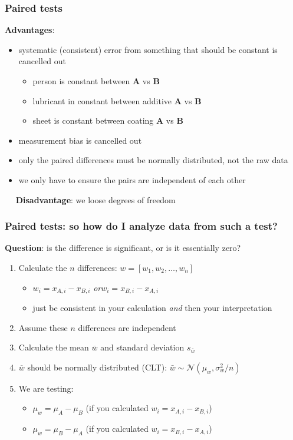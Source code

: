 \begin{frame}\frametitle{Paired tests}

	\textbf{Advantages}:
	\begin{itemize}
		\item	systematic (consistent) error from something that should be constant is cancelled out
		\begin{itemize}
			\item	person is constant between \textbf{A} vs \textbf{B}
			\item	lubricant in constant between additive \textbf{A} vs \textbf{B}
			\item	sheet is constant between coating \textbf{A} vs \textbf{B}
		\end{itemize}
		\item	measurement bias is cancelled out
		\item	only the paired differences must be normally distributed, not the raw data
		\item	we only have to ensure the pairs are independent of each other
	\end{itemize}

	$\quad$ \textbf{Disadvantage}: we loose degrees of freedom
\end{frame}

\begin{frame}\frametitle{Paired tests: so how do I analyze data from such a test?}

	\textbf{Question}: is the difference is significant, or is it essentially zero?
	\begin{enumerate}
		\item	Calculate the $n$ differences: $w = [w_1, w_2, \ldots, w_n]$
		\begin{itemize}
			\item	$w_i = x_{A,i} - x_{B,i}$  \qquad\emph{or}\qquad $w_i = x_{B,i} - x_{A,i}$
			\item	just be consistent in your calculation \emph{and} then your interpretation
		\end{itemize}
		\item	Assume these $n$ differences are independent
		\item	Calculate the mean $\overline{w}$ and standard deviation $s_{\overline{w}}$
		\item	$\overline{w}$ should be normally distributed (CLT): $\bar{w} \sim \mathcal{N}\left(\mu_w, \sigma_w^2/n \right)$
		\item	We are testing:
		\begin{itemize}
			\item	$\mu_w = \mu_A - \mu_B$  (if you calculated $w_i = x_{A,i} - x_{B,i}$)
			\item	$\mu_w = \mu_B - \mu_A$  (if you calculated $w_i = x_{B,i} - x_{A,i}$)
		\end{itemize}
	\end{enumerate}
\end{frame}

